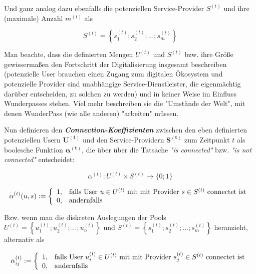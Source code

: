 Und ganz analog dazu ebenfalls die potenziellen Service-Provider $S^{(t)}$ und ihre (maximale) Anzahl $m^{(t)}$ als \\

\begin{Def}\label{defS}
\begin{equation*}
  S^{(t)} = \left\{ s^{(t)}_1; s^{(t)}_2;...; s^{(t)}_{m}\right\}
\end{equation*}
\end{Def}

\vspace{0.3cm}

Man beachte, dass die definierten Mengen $U^{(t)}$ und $S^{(t)}$ bzw. ihre Größe gewissermaßen den Fortschritt der Digitalisierung insgesamt beschreiben (potenzielle User brauchen einen Zugang zum digitalen Ökosystem und potenzielle Provider sind unabhängige Service-Dienstleister, die eigenmächtig darüber entscheiden, zu solchen zu werden) und in keiner Weise im Einfluss Wunderpasses stehen. Viel mehr beschreiben sie die "Umstände der Welt", mit denen WunderPass (wie alle anderen) "arbeiten" müssen.  

\vspace{0.6cm}


Nun definieren den \textbf{\textit{Connection-Koeffizienten}} zwischen den eben definierten potenziellen Usern $\mathbf{U^{(t)}}$ und den Service-Providern $\mathbf{S^{(t)}}$ zum Zeitpunkt $t$ als boolesche Funktion $\mathbf{\alpha^{(t)}}$, die über über die Tatsache \textit{"is connected"} bzw. \textit{"is not connected"} entscheidet: \\

\begin{Def}\label{defKoeff}

\begin{equation*}
  \alpha^{(t)} : U^{(t)} \times S^{(t)} \rightarrow \{0; 1\} 
\end{equation*}

\[
\alpha^{(t)}(u, s):=\left\{%
\begin{array}{ll}
    1, & \hbox{falls User $u \in U^{(t)}$ mit mit Provider $s \in S^{(t)}$ connectet ist} \\
    0, & \hbox{andernfalls} \\
\end{array}%
\right.
\]

\vspace{1cm}

Bzw. wenn man die diskreten Auslegungen der Pools $U^{(t)} = \left\{ u^{(t)}_1; u^{(t)}_2;...; u^{(t)}_{n} \right\}$ und $S^{(t)} = \left\{ s^{(t)}_1; s^{(t)}_2;...; s^{(t)}_{m} \right\}$ heranzieht, alternativ als

\[
\alpha^{(t)}_{ij}:=\left\{%
\begin{array}{ll}
    1, & \hbox{falls User $u^{(t)}_i \in U^{(t)}$ mit mit Provider $s^{(t)}_j \in S^{(t)}$ connectet ist} \\
    0, & \hbox{andernfalls} \\
\end{array}%
\right.
\]

\end{Def}

